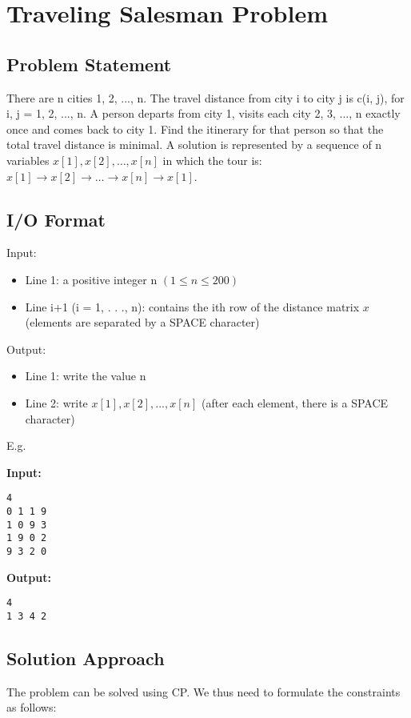 \documentclass{article}
\begin{document}
\pagebreak

\section{Traveling Salesman Problem}
\subsection{Problem Statement}
There are n cities 1, 2, ..., n. 
The travel distance from city i to city j is c(i, j), for i, j = 1, 2, ..., n.  
A person departs from city 1, visits each city 2, 3, ..., n exactly once and comes back to city 1. Find the itinerary for that person so that the total travel distance is minimal.
A solution is represented by a sequence of n variables $x[1], x[2], \dots , x[n]$ in which the tour is: $x[1] \rightarrow x[2] \rightarrow \dots \rightarrow x[n] \rightarrow x[1]$.

\subsection{I/O Format}
Input:

\begin{itemize}
    \item Line 1: a positive integer n $(1 \le n \le 200)$
    \item Line i+1 (i = 1, . . ., n): contains the ith row of the distance matrix $x$ (elements are separated by a SPACE character)
\end{itemize}

Output:
\begin{itemize}
    \item Line 1: write the value n
    \item Line 2: write $x[1], x[2], . . ., x[n]$ (after each element, there is a SPACE character)
\end{itemize}

E.g.
\begin{multicols}{2}
    
    \textbf{Input:}
    \begin{verbatim}
4
0 1 1 9
1 0 9 3
1 9 0 2
9 3 2 0
    \end{verbatim}
\columnbreak
    \textbf{Output:}
    \begin{verbatim}
4
1 3 4 2
    \end{verbatim}
\end{multicols}
\subsection{Solution Approach}
The problem can be solved using CP.
We thus need to formulate the constraints as follows:
\end{document}
